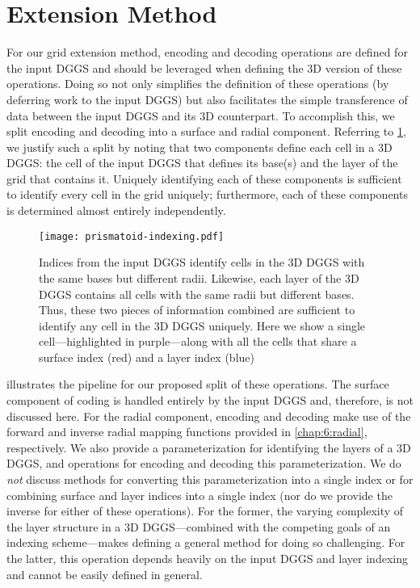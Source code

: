 \section{Extension Method} \label{chap:7:extension}
For our grid extension method, encoding and decoding operations are defined for the input DGGS and should be leveraged when defining the 3D version of these operations.
Doing so not only simplifies the definition of these operations (by deferring work to the input DGGS) but also facilitates the simple transference of data between the input DGGS and its 3D counterpart.
To accomplish this, we split encoding and decoding into a surface and radial component.
Referring to \cref{fig:prismatoid-indexing}, we justify such a split by noting that two components define each cell in a 3D DGGS: the cell of the input DGGS that defines its base(s) and the layer of the grid that contains it.
Uniquely identifying each of these components is sufficient to identify every cell in the grid uniquely; furthermore, each of these components is determined almost entirely independently.


\begin{figure}[htp!]
	\centering
	\texttt{[image: prismatoid-indexing.pdf]}
	\caption[Separation of surface and layer indices for the grid extension method]{
		Indices from the input DGGS identify cells in the 3D DGGS with the same bases but different radii.
		Likewise, each layer of the 3D DGGS contains all cells with the same radii but different bases.
		Thus, these two pieces of information combined are sufficient to identify any cell in the 3D DGGS uniquely.
		Here we show a single cell---highlighted in purple---along with all the cells that share a surface index (red) and a layer index (blue)
	}
	\label{fig:prismatoid-indexing}
\end{figure}


 illustrates the pipeline for our proposed split of these operations.
The surface component of coding is handled entirely by the input DGGS and, therefore, is not discussed here.
For the radial component, encoding and decoding make use of the forward and inverse radial mapping functions provided in \cref{chap:6:radial}, respectively.
We also provide a parameterization for identifying the layers of a 3D DGGS, and operations for encoding and decoding this parameterization.
We do \textit{not} discuss methods for converting this parameterization into a single index or for combining surface and layer indices into a single index (nor do we provide the inverse for either of these operations).
For the former, the varying complexity of the layer structure in a 3D DGGS---combined with the competing goals of an indexing scheme---makes defining a general method for doing so challenging.
For the latter, this operation depends heavily on the input DGGS and layer indexing and cannot be easily defined in general.


